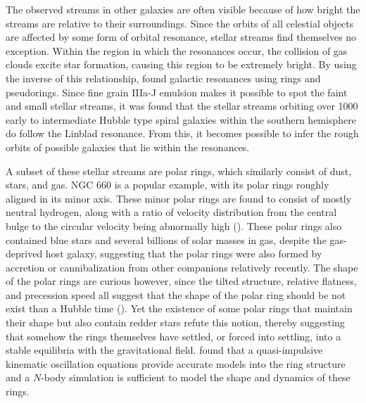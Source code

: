 \documentclass[twocolumn]{article}
\begin{document}
The observed streams in other galaxies are often visible because of how bright the streams are relative to their surroundings. 
Since the orbits of all celestial objects are affected by some form of orbital resonance, stellar streams find themselves no exception. Within the region in which the resonances occur, the collision of gas clouds excite star formation, causing this region to be extremely bright. By using the inverse of this relationship, \cite{ringsAndPseudoRings} found galactic resonances using rings and pseudorings. Since fine grain IIIa-J emulsion makes it possible to spot the faint and small stellar streams, it was found that the stellar streams orbiting over 1000 early to intermediate Hubble type spiral galaxies within the southern hemisphere do follow the Linblad resonance. From this, it becomes possible to infer the rough orbits of possible galaxies that lie within the resonances. 

A subset of these stellar streams are polar rings, which similarly consist of dust, stars, and gas. NGC 660 is a popular example, with its polar rings roughly aligned in its minor axis. These minor polar rings are found to consist of mostly neutral hydrogen, along with a ratio of velocity distribution from the central bulge to the circular velocity being abnormally high (\cite{distributionOfAtomicHydrogen}). These polar rings also contained blue stars and several billions of solar masses in gas, despite the gas-deprived host galaxy, suggesting that the polar rings were also formed by accretion or cannibalization from other companions relatively recently. The shape of the polar rings are curious however, since the tilted structure, relative flatness, and precession speed all suggest that the shape of the polar ring should be not exist than a Hubble time (\cite{selfGravitatingPolarRings}). Yet the existence of some polar rings that maintain their shape but also contain redder stars refute this notion, thereby suggesting that somehow the rings themselves have settled, or forced into settling, into a stable equilibria with the gravitational field. \cite{symmetricStellarRings} found that a quasi-impulsive kinematic oscillation equations provide accurate models into the ring structure and a $N$-body simulation is sufficient to model the shape and dynamics of these rings. 
\end{document}
